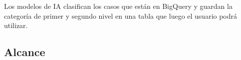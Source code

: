 Los modelos de IA clasifican los casos que están en BigQuery y guardan la categoría de primer y segundo nivel en una tabla que luego el usuario podrá utilizar.

\subsection{Alcance}

